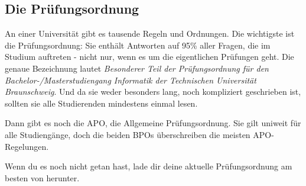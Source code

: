 
\subsection{Die Prüfungsordnung}
\label{po}
	An einer Universität gibt es tausende Regeln und Ordnungen. Die wichtigste ist die Prüfungsordnung: Sie enthält Antworten auf 95\% aller Fragen, die im Studium auftreten - nicht nur, wenn es um die eigentlichen Prüfungen geht. Die genaue Bezeichnung lautet \emph{Besonderer Teil der Prüfungsordnung für den Bachelor-/Masterstudiengang Informatik der Technischen Universität Braunschweig}. Und da sie weder besonders lang, noch kompliziert geschrieben ist, sollten sie alle Studierenden mindestens einmal lesen.

	Dann gibt es noch die APO, die Allgemeine Prüfungsordnung. Sie gilt uniweit für alle Studiengänge, doch die beiden BPOs überschreiben die meisten APO-Regelungen.

	Wenn du es noch nicht getan hast, lade dir deine aktuelle Prüfungsordnung am besten von  herunter. 


